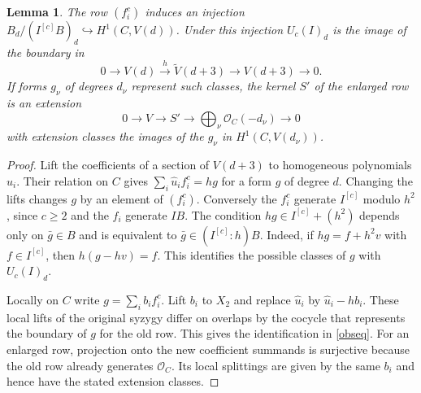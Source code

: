 \documentclass[11pt,a4paper,reqno]{amsart}
\numberwithin{equation}{section}
\theoremstyle{plain}
\newtheorem{lemma}[theorem]{Lemma}
\newcommand{\OO}{\mathcal O}
\begin{document}
\begin{lemma}\label{transfer}
The row $(f_i^c)$ induces an injection $B_d/(I^{[c]}B)_d\hookrightarrow H^1(C,V(d))$. Under this injection $U_c(I)_d$ is the image of the boundary in
\begin{equation}\label{obseq}
 0\longrightarrow V(d)\xrightarrow{h}\widetilde V(d+3)
   \longrightarrow V(d+3)\longrightarrow0 .
\end{equation}
If forms $g_\nu$ of degrees $d_\nu$ represent such classes, the kernel $S'$ of the enlarged row is an extension
\[
 0\longrightarrow V\longrightarrow S'
   \longrightarrow\bigoplus_\nu\OO_C(-d_\nu)\longrightarrow0
\]
with extension classes the images of the $g_\nu$ in $H^1(C,V(d_\nu))$.
\end{lemma}
\begin{proof}
Lift the coefficients of a section of $V(d+3)$ to homogeneous polynomials $\widehat u_i$. Their relation on $C$ gives $\sum_i\widehat u_i f_i^c=hg$ for a form $g$ of degree $d$. Changing the lifts changes $g$ by an element of $(f_i^c)$. Conversely the $f_i^c$ generate $I^{[c]}$ modulo $h^2$, since $c\ge2$ and the $f_i$ generate $IB$. The condition $hg\in I^{[c]}+(h^2)$ depends only on $\bar g\in B$ and is equivalent to $\bar g\in(I^{[c]}:h)B$. Indeed, if $hg=f+h^2v$ with $f\in I^{[c]}$, then $h(g-hv)=f$. This identifies the possible classes of $g$ with $U_c(I)_d$.

Locally on $C$ write $g=\sum_i b_i f_i^c$. Lift $b_i$ to $X_2$ and replace $\widehat u_i$ by $\widehat u_i-hb_i$. These local lifts of the original syzygy differ on overlaps by the cocycle that represents the boundary of $g$ for the old row. This gives the identification in \eqref{obseq}. For an enlarged row, projection onto the new coefficient summands is surjective because the old row already generates $\OO_C$. Its local splittings are given by the same $b_i$ and hence have the stated extension classes.
\end{proof}
\end{document}
